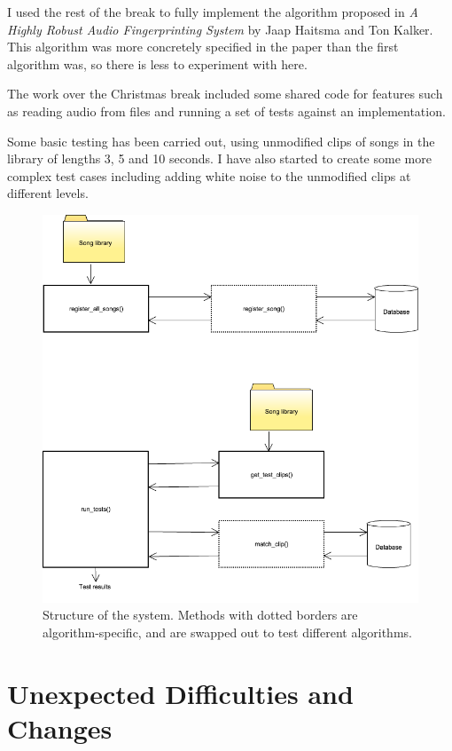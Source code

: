 \documentclass[12pt]{article}
\begin{document}
I used the rest of the break to fully implement the algorithm proposed in \emph{A Highly Robust Audio Fingerprinting System} by Jaap Haitsma and Ton Kalker. This algorithm was more concretely specified in the paper than the first algorithm was, so there is less to experiment with here.

The work over the Christmas break included some shared code for features such as reading audio from files and running a set of tests against an implementation.

Some basic testing has been carried out, using unmodified clips of songs in the library of lengths 3, 5 and 10 seconds. I have also started to create some more complex test cases including adding white noise to the unmodified clips at different levels.

\begin{figure}[htbp]
  \centering
  \includegraphics[width=\linewidth]{architecture}
  \caption{Structure of the system. Methods with dotted borders are algorithm-specific, and are swapped out to test different algorithms.}
\end{figure}


\newpage


\section*{Unexpected Difficulties and Changes}
\end{document}
